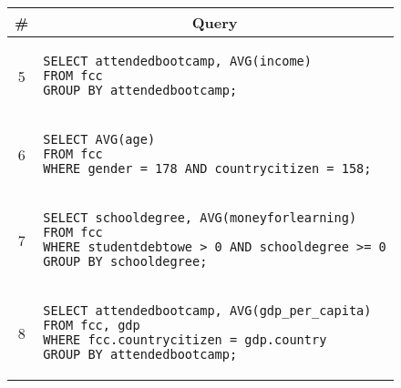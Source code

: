 \begin{tabular}{cl}
\toprule
\# & \multicolumn{1}{c}{Query} \\
\midrule
5 & 
\begin{minipage}{6in}
\begin{lstlisting}[breaklines]
SELECT attendedbootcamp, AVG(income)
FROM fcc
GROUP BY attendedbootcamp;
\end{lstlisting}
\end{minipage}{queryno} \label{q5} \\
6 & 
\begin{minipage}{6in}
\begin{lstlisting}[breaklines]
SELECT AVG(age)
FROM fcc
WHERE gender = 178 AND countrycitizen = 158;
\end{lstlisting}
\end{minipage}{queryno} \label{q6} \\
7 & 
\begin{minipage}{6in}
\begin{lstlisting}[breaklines]
SELECT schooldegree, AVG(moneyforlearning)
FROM fcc
WHERE studentdebtowe > 0 AND schooldegree >= 0
GROUP BY schooldegree;
\end{lstlisting}
\end{minipage}{queryno} \label{q7}\\
8 & 
\begin{minipage}{6in}
\begin{lstlisting}[breaklines]
SELECT attendedbootcamp, AVG(gdp_per_capita)
FROM fcc, gdp
WHERE fcc.countrycitizen = gdp.country
GROUP BY attendedbootcamp;
\end{lstlisting}
\end{minipage}{queryno} \label{q8}\\
\bottomrule
\end{tabular}
